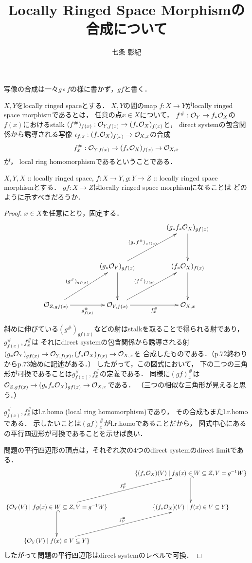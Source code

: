 \documentclass[a4paper]{jsarticle}
\title{Locally Ringed Space Morphismの合成について}
\author{七条 彰紀}
\begin{document}
\maketitle
写像の合成は一々$g \circ f$の様に書かず，$gf$と書く．

\begin{Def}
    $X,Y$をlocally ringed spaceとする．
    $X,Y$の間のmap $f: X \to Y$がlocally ringed space morphismであるとは，
    任意の点$x \in X$について，
    $f^{\#}: \mathcal{O}_Y \to f_* \mathcal{O}_X$の$f(x)$におけるstalk
    $(f^{\#})_{f(x)}: \mathcal{O}_{Y,f(x)} \to (f_* \mathcal{O}_X)_{f(x)}$と，
    direct systemの包含関係から誘導される写像
    $\iota_{f,x}: (f_* \mathcal{O}_X)_{f(x)} \to \mathcal{O}_{X,x}$の合成
    \[ f^{\#}_x: \mathcal{O}_{Y,f(x)} \to (f_* \mathcal{O}_X)_{f(x)} \to \mathcal{O}_{X,x} \]が，
    local ring homomorphismであるということである．
\end{Def}

$X,Y,X$ :: locally ringed space,
$f:X \to Y, g: Y \to Z$ :: locally ringed space morphismとする．
$gf: X \to Z$はlocally ringed space morphismになることは
どのように示すべきだろうか．

\begin{proof}
    $x \in X$を任意にとり，固定する．
    \[
    \xymatrix@=40pt
    {
        {} &
        {} &
        (g_*f_*\shO_X)_{gf(x)} \ar[d]\\
        {} &
        (g_*\shO_Y)_{gf(x)} \ar[d] \ar[ru]^-{(g_*f^{\#})_{gf(x)}}&
        (f_*\shO_X)_{f(x)} \ar[d] \\
        \shO_{Z,gf(x)} \ar[ru]^-{(g^{\#})_{gf(x)}}\ar[r]_-{g^{\#}_{f(x)}}&
        \shO_{Y,f(x)} \ar[ru]^-{(f^{\#})_{f(x)}} \ar[r]_-{f^{\#}_x}&
        \shO_{X,x}
    }
    \]

    斜めに伸びている$(g^{\#})_{gf(x)}$などの射はstalkを取ることで得られる射であり，
    $g^{\#}_{f(x)}, f^{\#}_{x}$は
    それにdirect systemの包含関係から誘導される射
    $(g_*\mathcal{O}_Y)_{gf(x)} \to \mathcal{O}_{Y,f(x)}, (f_*\mathcal{O}_X)_{f(x)} \to \mathcal{O}_{X,x}$を
    合成したものである．（p.72終わりからp.73始めに記述がある．）
    したがって，この図式において，
    下の二つの三角形が可換であることは$g^{\#}_{f(x)}, f^{\#}_{x}$の定義である．
    同様に$(gf)^{\#}_x$は$\mathcal{O}_{Z,gf(x)} \to (g_*f_*\mathcal{O}_X)_{gf(x)} \to \mathcal{O}_{X,x}$である．
    （三つの相似な三角形が見えると思う．）

    $g^{\#}_{f(x)}, f^{\#}_{x}$はl.r.homo (local ring homomorphism)であり，
    その合成もまたl.r.homoである．
    示したいことは$(gf)^{\#}_x$がl.r.homoであることだから，
    図式中心にあるの平行四辺形が可換であることを示せば良い．

    問題の平行四辺形の頂点は，それぞれ次の4つのdirect systemのdirect limitである．
    \[
    \xymatrix@=40pt
    {
        {} &
        \{ (f_*\shO_X)(V) \mid fg(x) \in W \subseteq Z, V=g^{-1}W \} \ar@{^{(}->}[d]\\
        \{ \shO_Y(V) \mid fg(x) \in W \subseteq Z, V=g^{-1}W \} \ar@{^{(}->}[d] \ar[ru]^-{f^{\#}_V}&
        \{ (f_*\shO_X)(V) \mid f(x) \in V \subseteq Y \} \\
        \{ \shO_Y(V) \mid f(x) \in V \subseteq Y \} \ar[ru]^-{f^{\#}_V}&
        {}
    }
    \]
    したがって問題の平行四辺形はdirect systemのレベルで可換．
\end{proof}
\end{document}
